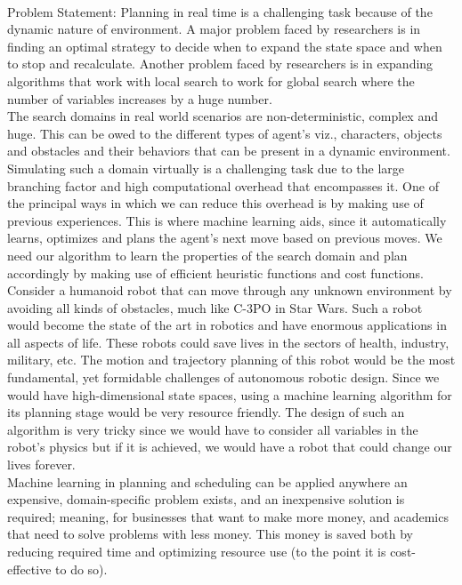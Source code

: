 \documentclass[tog]{acmsiggraph}
\begin{document}
\paragraph{}
Problem Statement: Planning in real time is a challenging task because of the dynamic nature of environment. A major problem faced by researchers is in finding an optimal strategy to decide when to expand the state space and when to stop and recalculate. Another problem faced by researchers is in expanding algorithms that work with local search to work for global search where the number of variables increases by a huge number. 
\\
\indent The search domains in real world scenarios are non-deterministic, complex and huge. This can be owed to the different types of agent’s viz., characters, objects and obstacles and their behaviors that can be present in a dynamic environment. Simulating such a domain virtually is a challenging task due to the large branching factor and high computational overhead that encompasses it. One of the principal ways in which we can reduce this overhead is by making use of previous experiences. This is where machine learning aids, since it automatically learns, optimizes and plans the agent’s next move based on previous moves. We need our algorithm to learn the properties of the search domain and plan accordingly by making use of efficient heuristic functions and cost functions.
\\
\indent Consider a humanoid robot that can move through any unknown environment by avoiding all kinds of obstacles, much like C-3PO in Star Wars. Such a robot would become the state of the art in robotics and have enormous applications in all aspects of life. These robots could save lives in the sectors of health, industry, military, etc. The motion and trajectory planning of this robot would be the most fundamental, yet formidable challenges of autonomous robotic design. Since we would have high-dimensional state spaces, using a machine learning algorithm for its planning stage would be very resource friendly. The design of such an algorithm is very tricky since we would have to consider all variables in the robot’s physics but if it is achieved, we would have a robot that could change our lives forever.
\\
\indent Machine learning in planning and scheduling can be applied anywhere an expensive, domain-specific problem exists, and an inexpensive solution is required; meaning, for businesses that want to make more money, and academics that need to solve problems with less money. This money is saved both by reducing required time and optimizing resource use (to the point it is cost-effective to do so).
\end{document}
